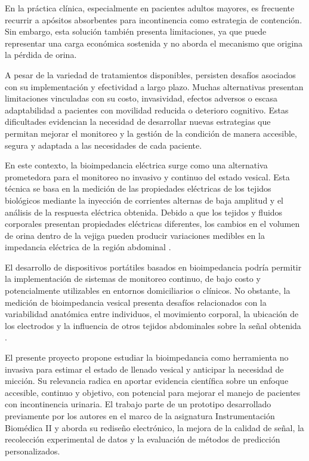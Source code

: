 \documentclass[12pt,a4paper]{article}
\begin{document}
En la práctica clínica, especialmente en pacientes adultos mayores, es frecuente recurrir a apósitos
absorbentes para incontinencia como estrategia de contención. Sin embargo, esta solución también presenta
limitaciones, ya que puede representar una carga económica sostenida y no aborda el mecanismo que
origina la pérdida de orina.

A pesar de la variedad de tratamientos disponibles, persisten desafíos asociados con su
implementación y efectividad a largo plazo. Muchas alternativas presentan limitaciones vinculadas
con su costo, invasividad, efectos adversos o escasa adaptabilidad a pacientes con movilidad
reducida o deterioro cognitivo. Estas dificultades evidencian la necesidad de desarrollar nuevas
estrategias que permitan mejorar el monitoreo y la gestión de la condición de manera accesible,
segura y adaptada a las necesidades de cada paciente.

En este contexto, la bioimpedancia eléctrica surge como una alternativa prometedora para el
monitoreo no invasivo y continuo del estado vesical. Esta técnica se basa en la medición de las
propiedades eléctricas de los tejidos biológicos mediante la inyección de corrientes alternas de
baja amplitud y el análisis de la respuesta eléctrica obtenida. Debido a que los tejidos y fluidos
corporales presentan propiedades eléctricas diferentes, los cambios en el volumen de orina dentro
de la vejiga pueden producir variaciones medibles en la impedancia eléctrica de la región abdominal
\cite{abbey1983bladder,liao2011bladder}.

El desarrollo de dispositivos portátiles basados en bioimpedancia podría permitir la implementación
de sistemas de monitoreo continuo, de bajo costo y potencialmente utilizables en entornos
domiciliarios o clínicos. No obstante, la medición de bioimpedancia vesical presenta desafíos
relacionados con la variabilidad anatómica entre individuos, el movimiento corporal, la ubicación
de los electrodos y la influencia de otros tejidos abdominales sobre la señal obtenida
\cite{palla2023review}.

El presente proyecto propone estudiar la bioimpedancia como herramienta no invasiva para estimar el
estado de llenado vesical y anticipar la necesidad de micción. Su relevancia radica en aportar
evidencia científica sobre un enfoque accesible, continuo y objetivo, con potencial para mejorar el
manejo de pacientes con incontinencia urinaria. El trabajo parte de un prototipo desarrollado
previamente por los autores en el marco de la asignatura Instrumentación Biomédica II
\cite{informe_grupo2_2025} y aborda su rediseño electrónico, la mejora de la calidad de señal, la recolección
experimental de datos y la evaluación de métodos de predicción personalizados.
\end{document}
